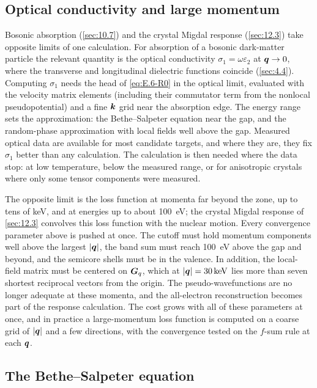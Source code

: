 \subsection{Optical conductivity and large momentum}

Bosonic absorption (\cref{sec:10.7}) and the crystal Migdal response (\cref{sec:12.3}) take opposite limits of one calculation. For absorption of a bosonic dark-matter particle the relevant quantity is the optical conductivity $\sigma_1 = \omega\varepsilon_2$ at $\bm{q}\to0$, where the transverse and longitudinal dielectric functions coincide (\cref{sec:4.4}). Computing $\sigma_1$ needs the head of \cref{eq:E.6-R0} in the optical limit, evaluated with the velocity matrix elements (including their commutator term from the nonlocal pseudopotential) and a fine $\bm{k}$ grid near the absorption edge. The energy range sets the approximation: the Bethe--Salpeter equation near the gap, and the random-phase approximation with local fields well above the gap. Measured optical data are available for most candidate targets, and where they are, they fix $\sigma_1$ better than any calculation. The calculation is then needed where the data stop: at low temperature, below the measured range, or for anisotropic crystals where only some tensor components were measured.

The opposite limit is the loss function at momenta far beyond the zone, up to tens of keV, and at energies up to about \SI{100}{eV}; the crystal Migdal response of \cref{sec:12.3} convolves this loss function with the nuclear motion. Every convergence parameter above is pushed at once. The cutoff must hold momentum components well above the largest $|\bm{q}|$, the band sum must reach \SI{100}{eV} above the gap and beyond, and the semicore shells must be in the valence. In addition, the local-field matrix must be centered on $\bm{G}_q$, which at $|\bm{q}| = \SI{30}{keV}$ lies more than seven shortest reciprocal vectors from the origin. The pseudo-wavefunctions are no longer adequate at these momenta, and the all-electron reconstruction becomes part of the response calculation. The cost grows with all of these parameters at once, and in practice a large-momentum loss function is computed on a coarse grid of $|\bm{q}|$ and a few directions, with the convergence tested on the $f$-sum rule at each $\bm{q}$.

\subsection{The Bethe--Salpeter equation}

